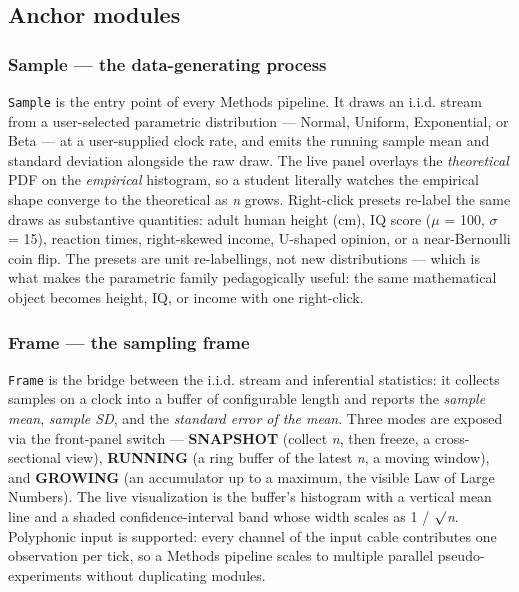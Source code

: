 \subsection{Anchor modules}\label{anchor-modules}

\subsubsection{Sample --- the data-generating
process}\label{sample-the-data-generating-process}

\texttt{Sample} is the entry point of every Methods pipeline. It draws
an i.i.d. stream from a user-selected parametric distribution ---
Normal, Uniform, Exponential, or Beta --- at a user-supplied clock rate,
and emits the running sample mean and standard deviation alongside the
raw draw. The live panel overlays the \emph{theoretical} PDF on the
\emph{empirical} histogram, so a student literally watches the empirical
shape converge to the theoretical as \emph{n} grows. Right-click presets
re-label the same draws as substantive quantities: adult human height
(cm), IQ score (\ensuremath{\mu} = 100, \ensuremath{\sigma} = 15), reaction times, right-skewed income,
U-shaped opinion, or a near-Bernoulli coin flip. The presets are unit
re-labellings, not new distributions --- which is what makes the
parametric family pedagogically useful: the same mathematical object
becomes height, IQ, or income with one right-click.

\subsubsection{Frame --- the sampling
frame}\label{frame-the-sampling-frame}

\texttt{Frame} is the bridge between the i.i.d. stream and inferential
statistics: it collects samples on a clock into a buffer of configurable
length and reports the \emph{sample mean}, \emph{sample SD}, and the
\emph{standard error of the mean}. Three modes are exposed via the
front-panel switch --- \textbf{SNAPSHOT} (collect \emph{n}, then freeze,
a cross-sectional view), \textbf{RUNNING} (a ring buffer of the latest
\emph{n}, a moving window), and \textbf{GROWING} (an accumulator up to a
maximum, the visible Law of Large Numbers). The live visualization is
the buffer's histogram with a vertical mean line and a shaded
confidence-interval band whose width scales as 1 / \ensuremath{\surd}\emph{n}. Polyphonic
input is supported: every channel of the input cable contributes one
observation per tick, so a Methods pipeline scales to multiple parallel
pseudo-experiments without duplicating modules.


